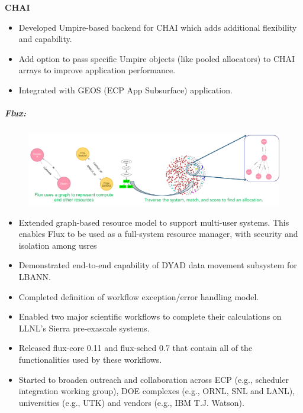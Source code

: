 {\bf CHAI}
\begin{itemize}
\item Developed Umpire-based backend for CHAI which adds additional flexibility
      and capability.
\item Add option to pass specific Umpire objects (like pooled allocators) to
      CHAI arrays to improve application performance.
\item Integrated with GEOS (ECP App Subsurface) application.
\end{itemize}

\subparagraph{Flux:}
\begin{figure}[tb]
\centering
\includegraphics[width=\textwidth]{projects/2.3.6-NNSA/2.3.6.02-LLNL-ATDM/flux-resource-model.pdf}
\end{figure}

\begin{itemize}

\item Extended graph-based resource model to support multi-user systems. This
      enables Flux to be used as a full-system resource manager, with security
      and isolation among usres

\item Demonstrated end-to-end capability of DYAD data movement subsystem for LBANN.

\item Completed definition of workflow exception/error handling model.

\item Enabled two major scientific workflows to complete their calculations on
      LLNL’s Sierra pre-exascale systems.

\item Released flux-core 0.11 and flux-sched 0.7 that contain all of the
      functionalities used by these workflows.

\item Started to broaden outreach and collaboration across ECP (e.g., scheduler
      integration working group), DOE complexes (e.g., ORNL, SNL and LANL),
      universities (e.g., UTK) and vendors (e.g., IBM T.J. Watson).

\end{itemize}

